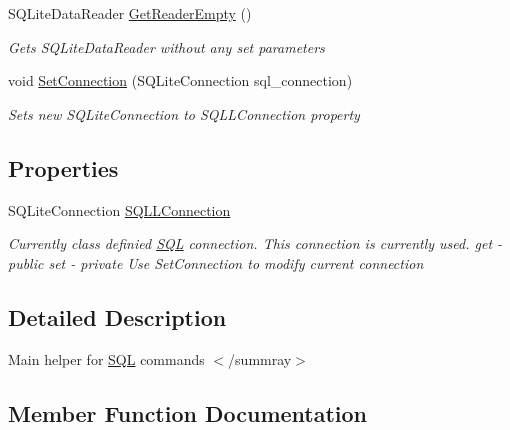\begin{DoxyCompactItemize}
S\+Q\+Lite\+Data\+Reader \mbox{\hyperlink{classOSML_1_1SQL_1_1SQLCommandHelper_a8a951367810d4216a8ea2c38cc5cf4ac}{Get\+Reader\+Empty}} ()
\begin{DoxyCompactList}\small\item\em Gets S\+Q\+Lite\+Data\+Reader without any set parameters \end{DoxyCompactList}\item 
void \mbox{\hyperlink{classOSML_1_1SQL_1_1SQLCommandHelper_aac343844e6797a8ebf9508b622ea9d70}{Set\+Connection}} (S\+Q\+Lite\+Connection sql\+\_\+connection)
\begin{DoxyCompactList}\small\item\em Sets new S\+Q\+Lite\+Connection to S\+Q\+L\+L\+Connection property \end{DoxyCompactList}\end{DoxyCompactItemize}
\subsection*{Properties}
\begin{DoxyCompactItemize}
\item 
S\+Q\+Lite\+Connection \mbox{\hyperlink{classOSML_1_1SQL_1_1SQLCommandHelper_a63fd14fd128d424031298589ea073745}{S\+Q\+L\+L\+Connection}}
\begin{DoxyCompactList}\small\item\em Currently class definied \mbox{\hyperlink{namespaceOSML_1_1SQL}{S\+QL}} connection. This connection is currently used. get -\/ public set -\/ private Use Set\+Connection to modify current connection \end{DoxyCompactList}\end{DoxyCompactItemize}


\subsection{Detailed Description}
Main helper for \mbox{\hyperlink{namespaceOSML_1_1SQL}{S\+QL}} commands $<$/summray$>$ 

\subsection{Member Function Documentation}
\mbox{\label{classOSML_1_1SQL_1_1SQLCommandHelper_a138f00ffaafdac45507d05875f7f92b5}} 
